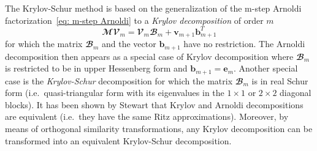     The Krylov-Schur method is based on the generalization of the m-step Arnoldi factorization~\eqref{eq: m-step Arnoldi} to a \emph{Krylov decomposition} of order $m$
    \begin{equation}
      \mathbfcal{MV}_m = \mathbfcal{V}_m \mathbfcal{B}_m + \mathbf{v}_{m+1} \mathbf{b}_{m+1}^T
      \label{eq: Krylov decomposition}
    \end{equation}
    for which the matrix $\mathbfcal{B}_m$ and the vector $\mathbf{b}_{m+1}$ have no restriction. The Arnoldi decomposition then appears as a special case of Krylov decomposition where $\mathbfcal{B}_m$ is restricted to be in upper Hessenberg form and $\mathbf{b}_{m+1} = \mathbf{e}_m$. Another special case is the \emph{Krylov-Schur} decomposition for which the matrix $\mathbfcal{B}_m$ is in real Schur form (i.e.\ quasi-triangular form with its eigenvalues in the $1 \times 1$ or $2 \times 2$ diagonal blocks). It has been shown by Stewart \cite{Stewart_SIAM_2001} that Krylov and Arnoldi decompositions are equivalent (i.e.\ they have the same Ritz approximations). Moreover, by means of orthogonal similarity transformations, any Krylov decomposition can be transformed into an equivalent Krylov-Schur decomposition.


